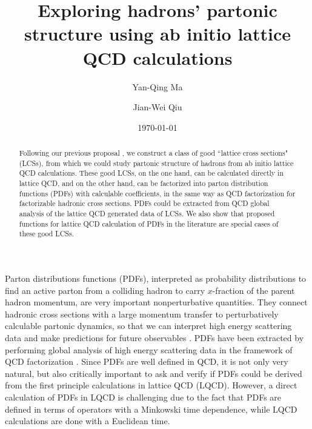 \documentclass[twocolumn,aps,prl,superscriptaddress,nofootinbib,showpacs]{revtex4-1}
\newcommand{\sect}[1]{\noindent{\it \textbf{#1} ---}}
\begin{document}
\title{Exploring hadrons' partonic structure using ab initio lattice QCD calculations}

\author{Yan-Qing Ma}
\author{Jian-Wei Qiu}


\date{\today}

\begin{abstract}
Following our previous proposal \cite{Ma:2014jla}, we construct a class of good ``lattice cross sections" (LCSs), from which we could study partonic structure of hadrons from ab initio lattice QCD calculations. These good LCSs, on the one hand, can be calculated directly in lattice QCD, and on the other hand, can be factorized into parton distribution functions (PDFs) with calculable coefficients, in the same way as QCD factorization for factorizable hadronic cross sections.  PDFs could be extracted from QCD global analysis of the lattice QCD generated data of LCSs.  We also show that proposed functions for lattice QCD calculation of PDFs in the literature are special cases of these good LCSs.
\end{abstract}

\maketitle
\allowdisplaybreaks

\sect{Introduction}	
Parton distributions functions (PDFs), interpreted as probability distributions to find an active parton from a colliding hadron to carry $x$-fraction of the parent hadron momentum, are very important nonperturbative quantities. They connect hadronic cross sections with a large momentum transfer to perturbatively calculable partonic dynamics, so that we can interpret high energy scattering data and make predictions for future observables \cite{Brambilla:2014jmp,Collins:1989gx}. PDFs have been extracted by performing global analysis of high energy scattering data in the framework of QCD factorization \cite{Dulat:2015mca,Martin:2009iq,Ball:2014uwa,Alekhin:2013nda,Ethier:2017zbq}. Since PDFs are well defined in QCD, it is not only very natural, but also critically important to ask and verify if PDFs could be derived from the first principle calculations in lattice QCD (LQCD).  However, a direct calculation of PDFs in LQCD is challenging due to the fact that PDFs are defined in terms of operators with a Minkowski time dependence, while LQCD calculations are done with a Euclidean time.
\end{document}
